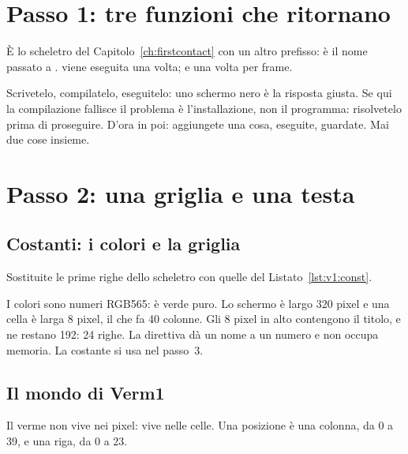 \section{Passo 1: tre funzioni che ritornano}


È lo scheletro del Capitolo~\ref{ch:firstcontact} con un altro prefisso:
 è il nome passato a .  viene
eseguita una volta;  e  una volta per frame.

\begin{prgcheck}[Eseguite]
Scrivetelo, compilatelo, eseguitelo: uno schermo nero è la risposta giusta. Se
qui la compilazione fallisce il problema è l'installazione, non il programma:
risolvetelo prima di proseguire. D'ora in poi: aggiungete una cosa, eseguite,
guardate. Mai due cose insieme.
\end{prgcheck}

\section{Passo 2: una griglia e una testa}

\subsection{Costanti: i colori e la griglia}

Sostituite le prime righe dello scheletro con quelle del
Listato~\ref{lst:v1:const}.


I colori sono numeri RGB565:  è verde puro. Lo schermo è largo 320
pixel e una cella è larga 8 pixel, il che fa 40 colonne. Gli 8 pixel in alto
contengono il titolo, e ne restano 192: 24 righe. La direttiva  dà
un nome a un numero e non occupa memoria. La costante  si usa
nel passo~3.

\subsection{Il mondo di Verm1}

\begin{prgconcept}
Il verme non vive nei pixel: vive nelle celle. Una posizione è una colonna, da
0 a 39, e una riga, da 0 a 23.
\end{prgconcept}

